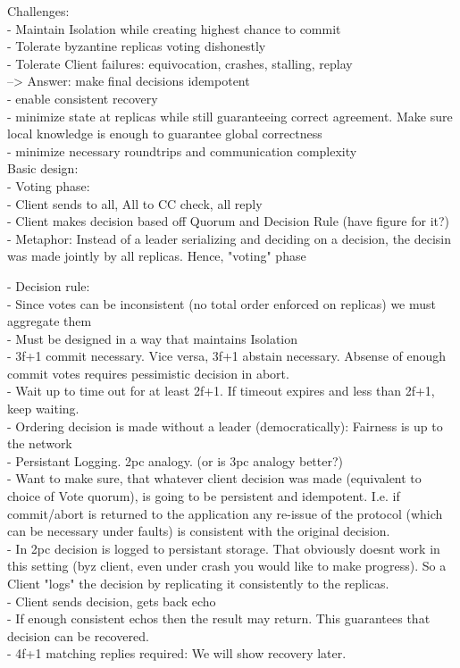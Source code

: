 Challenges:\\
- Maintain Isolation while creating highest chance to commit\\
- Tolerate byzantine replicas voting dishonestly\\
- Tolerate Client failures: equivocation, crashes, stalling, replay\\
--> Answer: make final decisions idempotent\\
- enable consistent recovery\\
- minimize state at replicas while still guaranteeing correct agreement. Make sure local knowledge is enough to guarantee global correctness\\
- minimize necessary roundtrips and communication complexity\\


Basic design:\\
- Voting phase:\\
	- Client sends to all, All to CC check, all reply\\
	- Client makes decision based off Quorum and Decision Rule (have figure for it?)\\
	- Metaphor: Instead of a leader serializing and deciding on a decision, the decisin was made jointly by all replicas. Hence, "voting" phase
	
- Decision rule:\\
	- Since votes can be inconsistent (no total order enforced on replicas) we must aggregate them\\
	- Must be designed in a way that maintains Isolation\\
	- 3f+1 commit necessary. Vice versa, 3f+1 abstain necessary. Absense of enough commit votes requires pessimistic decision in abort.\\
	- Wait up to time out for at least 2f+1. If timeout expires and less than 2f+1, keep waiting. \\
	
- Ordering decision is made without a leader (democratically): Fairness is up to the network\\
	
- Persistant Logging. 2pc analogy. (or is 3pc analogy better?)\\
	- Want to make sure, that whatever client decision was made (equivalent to choice of Vote quorum), is going to be persistent and idempotent. I.e. if commit/abort is returned to the application any re-issue of the protocol (which can be necessary under faults) is consistent with the original decision.\\
	- In 2pc decision is logged to persistant storage. That obviously doesnt work in this setting (byz client, even under crash you would like to make progress). So a Client "logs" the decision by replicating it consistently to the replicas.\\
	- Client sends decision, gets back echo\\
	- If enough consistent echos then the result may return. This guarantees that decision can be recovered.\\
	- 4f+1 matching replies required: We will show recovery later.\\
	
